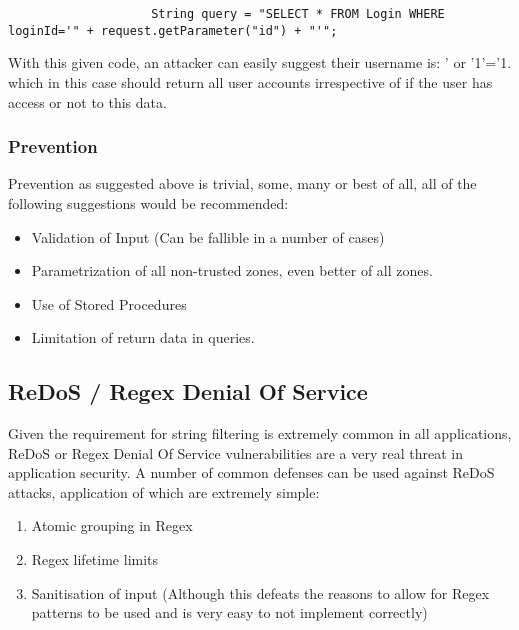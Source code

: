 \documentclass{IEEEtran}
\begin{document}
                \lstset{style=sharpc}
                \begin{lstlisting}
                    String query = "SELECT * FROM Login WHERE loginId='" + request.getParameter("id") + "'";
                \end{lstlisting}

                With this given code, an attacker can easily suggest their username is:
                ' or '1'='1. which in this case should return all user accounts 
                irrespective of if the user has access or not to this data.

            \subsubsection{Prevention}
                Prevention as suggested above is trivial, some, many or best of all, all 
                of the following suggestions would be recommended:
                \begin{itemize}
                    \item Validation of Input (Can be fallible in a number of cases)
                    \item Parametrization of all non-trusted zones, even better of all
                    zones.
                    \item Use of Stored Procedures
                    \item Limitation of return data in queries.
                \end{itemize}



        \newpage
        \subsection{ReDoS / Regex Denial Of Service}
            Given the requirement for string filtering is extremely common in all applications,
            ReDoS or Regex Denial Of Service\cite{ReDoS} vulnerabilities are a very real threat in application security.
            A number of common defenses can be used against ReDoS attacks, application of 
            which are extremely simple:
            \begin{enumerate}
                \item Atomic grouping in Regex
                \item Regex lifetime limits
                \item Sanitisation of input (Although this defeats the reasons to allow for
                Regex patterns to be used and is very easy to not implement correctly)
            \end{enumerate}
\end{document}
